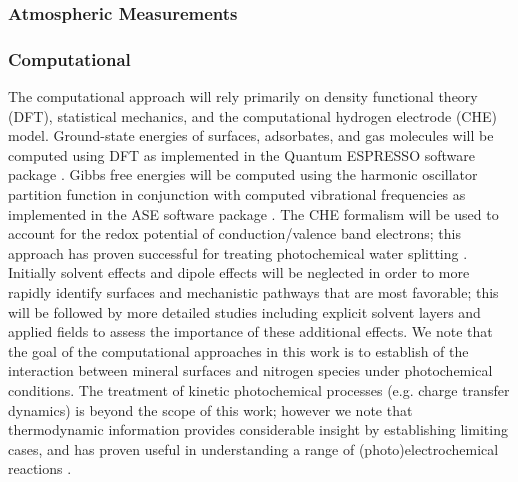 \vspace{1mm}
\subsubsection*{Atmospheric Measurements}
\vspace{1mm}


\vspace{1mm}
\subsubsection*{Computational}
\vspace{1mm}

The computational approach will rely primarily on density functional theory (DFT), statistical mechanics, and the computational hydrogen electrode (CHE) model. Ground-state energies of surfaces, adsorbates, and gas molecules will be computed using DFT as implemented in the Quantum ESPRESSO software package \cite{ESPRESSO}. Gibbs free energies will be computed using the harmonic oscillator partition function in conjunction with computed vibrational frequencies as implemented in the ASE software package \cite{ASE}. The CHE formalism \cite{Norskov_2004} will be used to account for the redox potential of conduction/valence band electrons; this approach has proven successful for treating photochemical water splitting \cite{Hellman_2017}. Initially solvent effects and dipole effects will be neglected in order to more rapidly identify surfaces and mechanistic pathways that are most favorable; this will be followed by more detailed studies including explicit solvent layers and applied fields to assess the importance of these additional effects. We note that the goal of the computational approaches in this work is to establish  of the interaction between mineral surfaces and nitrogen species under photochemical conditions. The treatment of kinetic photochemical processes (e.g. charge transfer dynamics) is beyond the scope of this work; however we note that thermodynamic information provides considerable insight by establishing limiting cases, and has proven useful in understanding a range of (photo)electrochemical reactions \cite{Norskov_2004,Peterson_2010,skulason2012theoretical,Comer_2017,Hellman_2017}.

